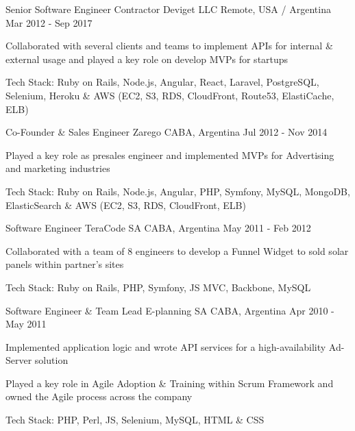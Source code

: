 \begin{cventries}
  \cventry
    {Senior Software Engineer Contractor}
    {Deviget LLC}
    {Remote, USA / Argentina}
    {Mar 2012 - Sep 2017}
    {
      \begin{cvitems}
        \item {Collaborated with several clients and teams to implement APIs for internal \& external usage and played a key role on develop MVPs for startups}
        \item {Tech Stack: Ruby on Rails, Node.js, Angular, React, Laravel, PostgreSQL, Selenium, Heroku \& AWS (EC2, S3, RDS, CloudFront, Route53, ElastiCache, ELB)}
      \end{cvitems}
    }

  \cventry
    {Co-Founder \& Sales Engineer}
    {Zarego}
    {CABA, Argentina}
    {Jul 2012 - Nov 2014}
    {
      \begin{cvitems}
        \item {Played a key role as presales engineer and implemented MVPs for Advertising and marketing industries}
        \item {Tech Stack: Ruby on Rails, Node.js, Angular, PHP, Symfony, MySQL, MongoDB, ElasticSearch \& AWS (EC2, S3, RDS, CloudFront, ELB)}
      \end{cvitems}
    }

  \cventry
    {Software Engineer}
    {TeraCode SA}
    {CABA, Argentina}
    {May 2011 - Feb 2012}
    {
      \begin{cvitems}
        \item {Collaborated with a team of 8 engineers to develop a Funnel Widget to sold solar panels within partner's sites}
        \item {Tech Stack: Ruby on Rails, PHP, Symfony, JS MVC, Backbone, MySQL}
      \end{cvitems}
    }

  \cventry
    {Software Engineer \& Team Lead}
    {E-planning SA}
    {CABA, Argentina}
    {Apr 2010 - May 2011}
    {
      \begin{cvitems}
        \item {Implemented application logic and wrote API services for a high-availability Ad-Server solution}
        \item {Played a key role in Agile Adoption \& Training within Scrum Framework and owned the Agile process across the company}
        \item {Tech Stack: PHP, Perl, JS, Selenium, MySQL, HTML \& CSS}
      \end{cvitems}
    }


\end{cventries}
